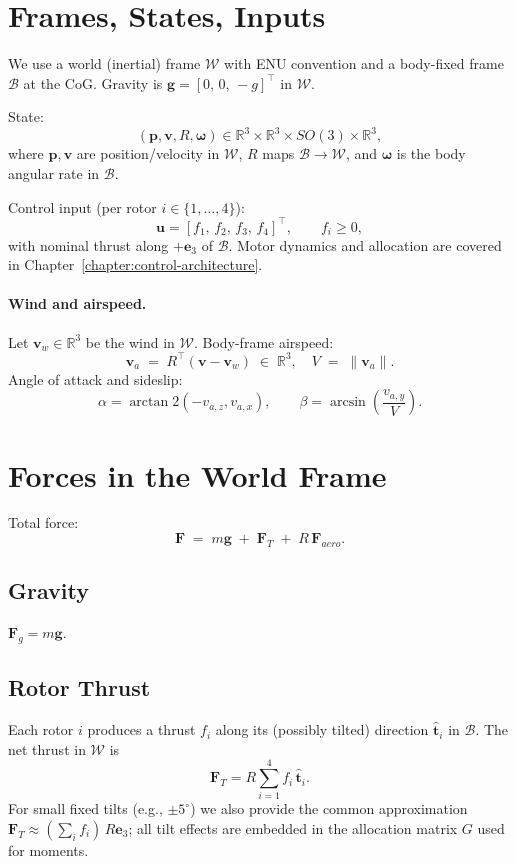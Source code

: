 \section{Frames, States, Inputs}
We use a world (inertial) frame $\mathcal{W}$ with ENU convention and a body-fixed frame $\mathcal{B}$ at the CoG. Gravity is $\mathbf{g}=[0,\,0,\,-g]^\top$ in $\mathcal{W}$.

State:
\[
(\mathbf{p},\mathbf{v},R,\boldsymbol{\omega})
\in \mathbb{R}^3\times\mathbb{R}^3\times SO(3)\times\mathbb{R}^3,
\]
where $\mathbf{p},\mathbf{v}$ are position/velocity in $\mathcal{W}$, $R$ maps $\mathcal{B}\!\to\!\mathcal{W}$, and $\boldsymbol{\omega}$ is the body angular rate in $\mathcal{B}$.

Control input (per rotor $i\in\{1,\dots,4\}$):
\[
\mathbf{u}=[f_1,\,f_2,\,f_3,\,f_4]^\top, \qquad f_i\ge 0,
\]
with nominal thrust along $+\mathbf{e}_3$ of $\mathcal{B}$. Motor dynamics and allocation are covered in Chapter~\ref{chapter:control-architecture}.

\paragraph{Wind and airspeed.}
Let $\mathbf{v}_w\in\mathbb{R}^3$ be the wind in $\mathcal{W}$. Body-frame airspeed:
\[
\mathbf{v}_a \;=\; R^\top(\mathbf{v}-\mathbf{v}_w) \;\in\; \mathbb{R}^3, \quad
V \;=\;\|\mathbf{v}_a\|.
\]
Angle of attack and sideslip:
\[
\alpha = \arctan2(-v_{a,z}, v_{a,x}), \qquad
\beta = \arcsin\left(\frac{v_{a,y}}{V}\right).
\]

\section{Forces in the World Frame}
Total force:
\begin{equation}
\mathbf{F} \;=\; m\mathbf{g} \;+\; \mathbf{F}_T \;+\; R\,\mathbf{F}_{\!aero}.
\end{equation}

\subsection{Gravity}
$\mathbf{F}_g=m\mathbf{g}$.

\subsection{Rotor Thrust}
Each rotor $i$ produces a thrust $f_i$ along its (possibly tilted) direction $\hat{\mathbf{t}}_i$ in $\mathcal{B}$. The net thrust in $\mathcal{W}$ is
\begin{equation}
\mathbf{F}_T = R\sum_{i=1}^4 f_i\,\hat{\mathbf{t}}_i.
\end{equation}
For small fixed tilts (e.g., $\pm 5^\circ$) we also provide the common approximation $\mathbf{F}_T \approx (\sum_i f_i)\,R\mathbf{e}_3$; all tilt effects are embedded in the allocation matrix $G$ used for moments.

